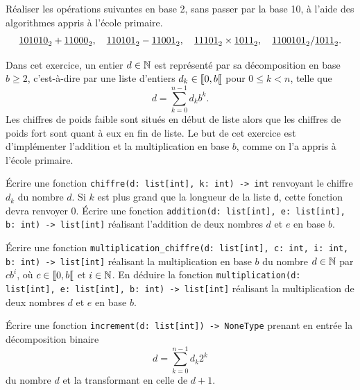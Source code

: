 \documentclass{magnoliaold}
\begin{document}


Réaliser les opérations suivantes en base 2, sans passer par la base 10, à l'aide des
algorithmes appris à l'école primaire.
\[\underline{101010}_2+\underline{11000}_2,\quad \underline{110101}_2-\underline{11001}_2,\quad \underline{11101}_2 \times \underline{1011}_2,\quad
  \underline{1100101}_2 / \underline{1011}_2.\]


Dans cet exercice, un entier $d\in\mathbb{N}$ est représenté par sa décomposition en base
$b\geq 2$, c'est-à-dire par une liste d'entiers $d_k\in\left\llbracket 0,b\right\llbracket$ pour $0\leq k<n$,
telle que
\[d=\sum_{k=0}^{n-1} d_k b^k.\]
Les chiffres de poids faible sont situés en début de liste alors que les chiffres
de poids fort sont quant à eux en fin de liste.  Le but de cet exercice est
d'implémenter l'addition et la multiplication en base $b$, comme on l'a appris à l'école
primaire.
\begin{questions}
\question Écrire une fonction \verb!chiffre(d: list[int], k: int) -> int! renvoyant
  le chiffre $d_k$ du nombre $d$. Si $k$ est plus grand que la longueur de
  la liste \verb!d!, cette fonction devra renvoyer 0.
\question Écrire une fonction
  \verb!addition(d: list[int], e: list[int], b: int) -> list[int]! réalisant l'addition
  de deux nombres $d$ et $e$ en base $b$.
\question
\begin{questions}
\question Écrire une fonction
  \verb!multiplication_chiffre(d: list[int], c: int, i: int, b: int) -> list[int]!
  réalisant la multiplication en base $b$ du nombre $d\in\mathbb{N}$ par $c b^i$, où
  $c\in\left\llbracket 0,b\right\llbracket$ et $i\in\mathbb{N}$.
\question En déduire la fonction \verb!multiplication(d: list[int], e: list[int], b: int) -> list[int]!
  réalisant la multiplication de deux nombres $d$ et $e$ en base $b$. 
\end{questions}
\end{questions}

Écrire une fonction \verb!increment(d: list[int]) -> NoneType! prenant en entrée la
décomposition binaire
\[d=\sum_{k=0}^{n-1} d_k 2^k\]
du nombre $d$ et la transformant en celle de $d+1$.
\end{document}
